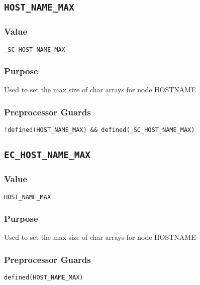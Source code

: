 
\subsection{\texttt{HOST\_NAME\_MAX}}
\vspace{-2ex}
\subsubsection{Value}
\vspace{-2ex}
\verb|_SC_HOST_NAME_MAX|

\vspace{-2ex}
\subsubsection{Purpose}
\vspace{-2ex}
Used to set the max size of char arrays for node HOSTNAME

\vspace{-2ex}
\subsubsection{Preprocessor Guards}
\vspace{-2ex}
\verb|!defined(HOST_NAME_MAX) && defined(_SC_HOST_NAME_MAX)|


\subsection{\texttt{EC\_HOST\_NAME\_MAX}}
\vspace{-2ex}
\subsubsection{Value}
\vspace{-2ex}
\verb|HOST_NAME_MAX|

\vspace{-2ex}
\subsubsection{Purpose}
\vspace{-2ex}
Used to set the max size of char arrays for node HOSTNAME

\vspace{-2ex}
\subsubsection{Preprocessor Guards}
\vspace{-2ex}
\verb|defined(HOST_NAME_MAX)|

